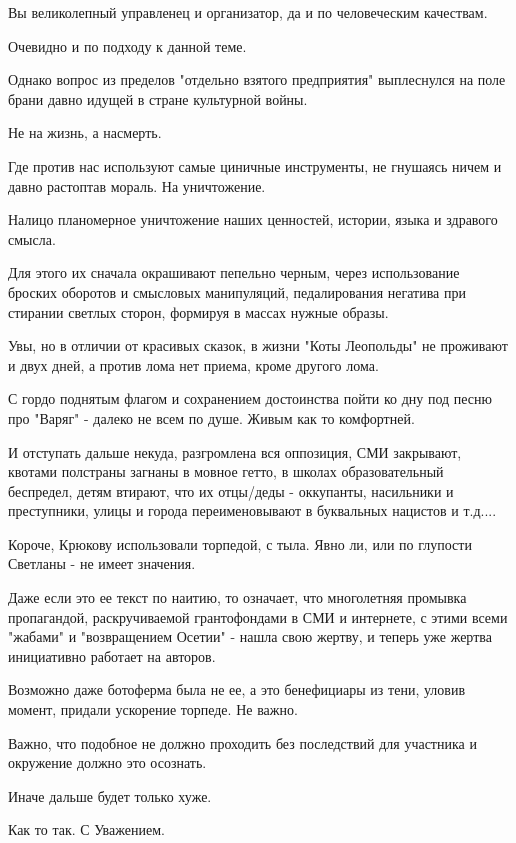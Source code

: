 \begin{itemize}
Вы великолепный управленец и организатор, да и по человеческим качествам.

Очевидно и по подходу к данной теме.

Однако вопрос из пределов "отдельно взятого предприятия" выплеснулся на поле
брани давно идущей в стране культурной войны.

Не на жизнь, а насмерть.

Где против нас используют самые циничные инструменты, не гнушаясь ничем и давно
растоптав мораль. На уничтожение.

Налицо планомерное уничтожение наших ценностей, истории, языка и здравого
смысла.

Для этого их сначала окрашивают пепельно черным, через использование броских
оборотов и смысловых манипуляций, педалирования негатива при стирании светлых
сторон, формируя в массах нужные образы.

Увы, но в отличии от красивых сказок, в жизни "Коты Леопольды" не проживают и
двух дней, а против лома нет приема, кроме другого лома.

С гордо поднятым флагом и сохранением достоинства пойти ко дну под песню про
"Варяг" - далеко не всем по душе. Живым как то комфортней.

И отступать дальше некуда, разгромлена вся оппозиция, СМИ закрывают, квотами
полстраны загнаны в мовное гетто, в школах образовательный беспредел, детям
втирают, что их отцы/деды - оккупанты, насильники и преступники, улицы и города
переименовывают в буквальных нацистов и т.д....

Короче, Крюкову использовали торпедой, с тыла. Явно ли, или по глупости
Светланы - не имеет значения.

Даже если это ее текст по наитию, то означает, что многолетняя промывка
пропагандой, раскручиваемой грантофондами в СМИ и интернете, с этими всеми
"жабами" и "возвращением Осетии" - нашла свою жертву, и теперь уже жертва
инициативно работает на авторов.

Возможно даже ботоферма была не ее, а это бенефициары из тени, уловив момент,
придали ускорение торпеде. Не важно.

Важно, что подобное не должно проходить без последствий для участника и
окружение должно это осознать.

Иначе дальше будет только хуже.

Как то так.
С Уважением.



\end{itemize}
